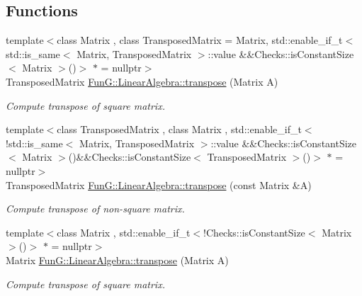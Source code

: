 \subsection*{Functions}
\begin{DoxyCompactItemize}
\item 
{\footnotesize template$<$class Matrix , class Transposed\+Matrix  = Matrix, std\+::enable\+\_\+if\+\_\+t$<$ std\+::is\+\_\+same$<$ Matrix, Transposed\+Matrix $>$\+::value \&\&\+Checks\+::is\+Constant\+Size$<$ Matrix $>$()$>$ $\ast$  = nullptr$>$ }\\Transposed\+Matrix \hyperlink{group__LinearAlgebraGroup_gaf299ac9490ae23da0a3a3d784e379d1f}{Fun\+G\+::\+Linear\+Algebra\+::transpose} (Matrix A)
\begin{DoxyCompactList}\small\item\em Compute transpose of square matrix. \end{DoxyCompactList}\item 
{\footnotesize template$<$class Transposed\+Matrix , class Matrix , std\+::enable\+\_\+if\+\_\+t$<$!std\+::is\+\_\+same$<$ Matrix, Transposed\+Matrix $>$\+::value \&\&\+Checks\+::is\+Constant\+Size$<$ Matrix $>$()\&\&\+Checks\+::is\+Constant\+Size$<$ Transposed\+Matrix $>$()$>$ $\ast$  = nullptr$>$ }\\Transposed\+Matrix \hyperlink{group__LinearAlgebraGroup_gaffe414459cb85a455a3c5a2099cfc6ee}{Fun\+G\+::\+Linear\+Algebra\+::transpose} (const Matrix \&A)
\begin{DoxyCompactList}\small\item\em Compute transpose of non-\/square matrix. \end{DoxyCompactList}\item 
{\footnotesize template$<$class Matrix , std\+::enable\+\_\+if\+\_\+t$<$!\+Checks\+::is\+Constant\+Size$<$ Matrix $>$()$>$ $\ast$  = nullptr$>$ }\\Matrix \hyperlink{group__LinearAlgebraGroup_gac3427d39b75727a255e5ea387c50ff10}{Fun\+G\+::\+Linear\+Algebra\+::transpose} (Matrix A)
\begin{DoxyCompactList}\small\item\em Compute transpose of square matrix. \end{DoxyCompactList}\end{DoxyCompactItemize}
